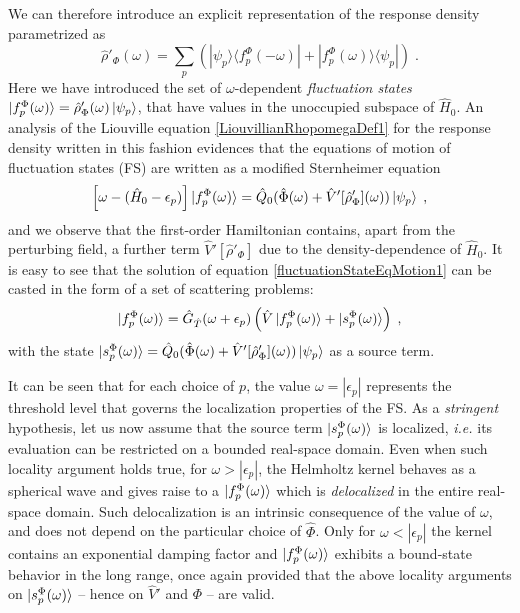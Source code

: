 \documentclass[reprint,aps,prb]{revtex4-1}
\newcommand{\eps}{\epsilon}
\newcommand{\be}{\begin{equation}}
\newcommand{\ee}{\end{equation}}
\newcommand{\lb}{\label}
\newcommand{\op}[1]{\hat {#1}}
\newcommand{\ketbra}[2]{| #1 \rangle \langle #2 |}
\newcommand{\dm}{\op{\rho}}
\newcommand{\hnot}{\op{H}_0}
\newcommand{\GH}{\op G_{\op T}}
\begin{document}
We can therefore introduce an explicit representation of the
response density parametrized as
\be\lb{rhoPrimeFluctuationStateDef1}
\dm'_\Phi(\omega) = \sum_p\left(\ketbra{\psi_p}{f_p^\Phi(-\omega)} + \ketbra{f_p^\Phi(\omega)}{\psi_p}\right) \;.
\ee
Here we have introduced the set of $\omega$-dependent \emph{fluctuation states}
$\ket{f_p^\Phi(\omega)} = \dm'_\Phi(\omega) \ket{\psi_p}$, that have values in the unoccupied subspace of $\hnot$.
An analysis of the Liouville equation \eqref{LiouvillianRhopomegaDef1} for the response density written in this fashion evidences that the equations of motion of fluctuation states (FS) are
written as a modified Sternheimer equation~\cite{mahan1980,giustino2012,giustino2014}
\be\lb{fluctuationStateEqMotion1}
\left[\omega - (\hnot-\eps_p)\right]\ket{f_p^\Phi(\omega)} = \op Q_0(\op\Phi(\omega)+\op V'[\dm'_\Phi](\omega))\ket{\psi_p} \;,
\ee
and we observe that the first-order Hamiltonian contains,
apart from the perturbing field, a further term $\op V'[\dm'_\Phi]$ due to the density-dependence of $\hnot$.
It is easy to see that the solution of equation \eqref{fluctuationStateEqMotion1} can be casted in the form of
a set of scattering problems:
\be\lb{rhoPrimeFluctuationStateDef2}
\ket{f_p^\Phi(\omega)} = \GH(\omega+\epsilon_p)\left(\op V\ket{f_p^\Phi(\omega)} + \ket{s_p^\Phi(\omega)} \right)\;,
\ee
with the state
$
\ket{s_p^\Phi(\omega)} = \op Q_0(\op \Phi(\omega) +\op V'[\dm'_\Phi](\omega) )\ket{\psi_p}
$ as a source term.

It can be seen that for each choice of $p$, the value $\omega = |\eps_p|$ represents the threshold level
that governs the localization properties of the FS.
As a \emph{stringent} hypothesis, let us now assume that the source term $\ket{s_p^\Phi(\omega)}$ is localized, \textit{i.e.} its evaluation can be
restricted on a bounded real-space domain.
Even when such locality argument holds true, for $\omega > |\eps_p|$,
the Helmholtz kernel behaves as a spherical wave and  gives raise to a $\ket{f^\Phi_p(\omega)}$ which is \emph{delocalized} in the entire real-space domain.
Such delocalization is an intrinsic consequence of the value of $\omega$, and does not depend on the particular choice of
$\op \Phi$.
Only for $\omega < |\eps_p|$ the kernel contains an exponential damping factor and $\ket{f^\Phi_p(\omega)}$ exhibits a bound-state behavior in the long range,
once again provided that the above locality arguments on $\ket{s_p^\Phi(\omega)}$ -- hence on $\op V'$ and $\Phi$ -- are valid.
\end{document}
